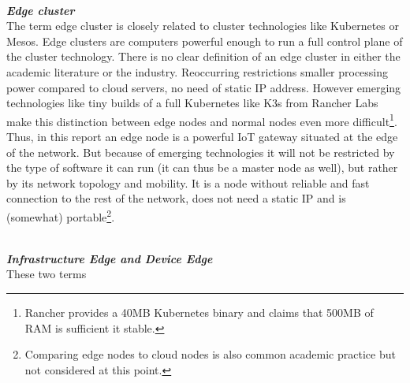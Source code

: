 \vspace{0.5mm}\\
\textbf\textit{Edge cluster}\\
The term edge cluster is closely related to cluster technologies like Kubernetes or Mesos. Edge clusters are computers powerful enough to run a full control plane of the cluster technology. There is no clear definition of an edge cluster in either the academic literature or the industry. Reoccurring restrictions smaller processing power compared to cloud servers, no need of static IP address. However emerging technologies like tiny builds of a full Kubernetes like K3s from Rancher Labs\cite{k3sLight14:online} make this distinction between edge nodes and normal nodes even more difficult\footnote{Rancher provides a  40MB Kubernetes binary and claims that 500MB of RAM is sufficient it stable.}.\\  
Thus, in this report an edge node is a powerful IoT gateway situated at the edge of the network. But because of emerging technologies it will not be restricted by the type of software it can run (it can thus be a master node as well), but rather by its network topology and mobility. It is a node without reliable and fast connection to the rest of the network, does not need a static IP and is (somewhat) portable\footnote{Comparing edge nodes to cloud nodes is also common academic practice\cite{contstraintDevicesTerminology}  but not considered at this point.}.


\vspace{0.5mm}\\
\textbf\textit{Infrastructure Edge and Device Edge}\\

These two terms 


